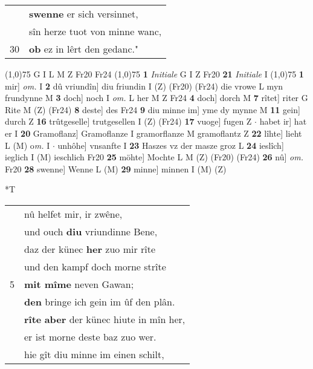 \documentclass[8pt,a4paper,notitlepage]{article}
\begin{document}
\begin{table}[ht]
\begin{minipage}[t]{0.5\linewidth}
\begin{tabular}{rl}
 & \textbf{swenne} er sich versinnet,\\ 
 & sîn herze tuot von minne wanc,\\ 
30 & \textbf{ob} ez in lêrt den gedanc."\\ 
\end{tabular}
\scriptsize
\line(1,0){75} \newline
G I L M Z Fr20 Fr24 \newline
\line(1,0){75} \newline
\textbf{1} \textit{Initiale} G I Z Fr20  \textbf{21} \textit{Initiale} I  \newline
\line(1,0){75} \newline
\textbf{1} mir] \textit{om.} I \textbf{2} dû vriundîn] diu friundin I (Z) (Fr20) (Fr24) die vrowe L myn frundynne M \textbf{3} doch] noch I \textit{om.} L her M Z Fr24 \textbf{4} doch] dorch M \textbf{7} rîtet] riter G Rite M (Z) (Fr24) \textbf{8} deste] des Fr24 \textbf{9} diu minne im] yme dy mynne M \textbf{11} gein] durch Z \textbf{16} trûtgeselle] trutgesellen I (Z) (Fr24) \textbf{17} vuoge] fugen Z  $\cdot$ habet ir] hat er I \textbf{20} Gramoflanz] Gramoflanze I gramorflanze M gramoflantz Z \textbf{22} lîhte] lieht L (M) o\textit{m. } I  $\cdot$ unhôhe] vnsanfte I \textbf{23} Haszes vz der masze groz L \textbf{24} ieslîch] ieglich I (M) ieschlich Fr20 \textbf{25} möhte] Mochte L M (Z) (Fr20) (Fr24) \textbf{26} nû] \textit{om.} Fr20 \textbf{28} swenne] Wenne L (M) \textbf{29} minne] minnen I (M) (Z) \newline
\end{minipage}
\hspace{0.5cm}
\begin{minipage}[t]{0.5\linewidth}
\small
\begin{center}*T
\end{center}
\begin{tabular}{rl}
 & nû helfet mir, ir zwêne,\\ 
 & und ouch \textbf{diu} vriundinne Bene,\\ 
 & daz der künec \textbf{her} zuo mir rîte\\ 
 & und den kampf doch morne strîte\\ 
5 & \textbf{mit mîme} neven Gawan;\\ 
 & \textbf{den} bringe ich gein im ûf den plân.\\ 
 & \textbf{rîte} \textbf{aber} der künec hiute in mîn her,\\ 
 & er ist morne deste baz zuo wer.\\ 
 & hie gît diu minne im einen schilt,\\ 

\end{tabular}
\end{minipage}
\end{table}
\end{document}

